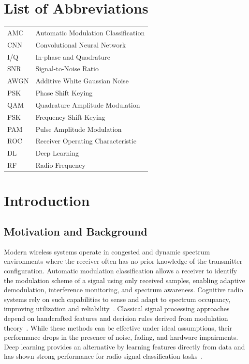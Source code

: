 \documentclass[12pt,a4paper]{report}
\begin{document}
\chapter*{List of Abbreviations}
\begin{tabular}{ll}
AMC & Automatic Modulation Classification \\
CNN & Convolutional Neural Network \\
I/Q & In-phase and Quadrature \\
SNR & Signal-to-Noise Ratio \\
AWGN & Additive White Gaussian Noise \\
PSK & Phase Shift Keying \\
QAM & Quadrature Amplitude Modulation \\
FSK & Frequency Shift Keying \\
PAM & Pulse Amplitude Modulation \\
ROC & Receiver Operating Characteristic \\
DL & Deep Learning \\
RF & Radio Frequency \\
\end{tabular}

\tableofcontents
\listoffigures
\listoftables

\chapter{Introduction}

\section{Motivation and Background}
Modern wireless systems operate in congested and dynamic spectrum environments where the receiver often has no prior knowledge of the transmitter configuration. Automatic modulation classification allows a receiver to identify the modulation scheme of a signal using only received samples, enabling adaptive demodulation, interference monitoring, and spectrum awareness. Cognitive radio systems rely on such capabilities to sense and adapt to spectrum occupancy, improving utilization and reliability~\cite{haykin2005cognitive}. Classical signal processing approaches depend on handcrafted features and decision rules derived from modulation theory~\cite{proakis2001digital,sklar2001digital}. While these methods can be effective under ideal assumptions, their performance drops in the presence of noise, fading, and hardware impairments. Deep learning provides an alternative by learning features directly from data and has shown strong performance for radio signal classification tasks~\cite{oshea2016cnn,goodfellow2016dl}.
\end{document}

